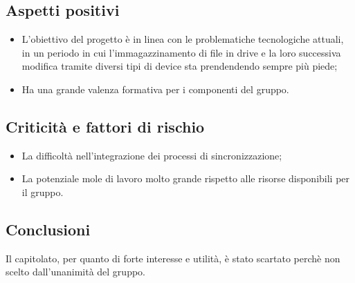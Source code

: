 \subsection{Aspetti positivi}
\begin{itemize}
    \item L'obiettivo del progetto è in linea con le problematiche tecnologiche attuali, in un periodo in cui l'immagazzinamento di file in drive e la loro successiva modifica tramite diversi tipi di device sta prendendendo sempre più piede;
    \item Ha una grande valenza formativa per i componenti del gruppo.
\end{itemize}
\subsection{Criticità e fattori di rischio}
\begin{itemize}
    \item La difficoltà nell'integrazione dei processi di sincronizzazione;
    \item La potenziale mole di lavoro molto grande rispetto alle risorse disponibili per il gruppo.
\end{itemize}
\subsection{Conclusioni}
Il capitolato, per quanto di forte interesse e utilità, è stato scartato perchè non scelto dall'unanimità del gruppo.
